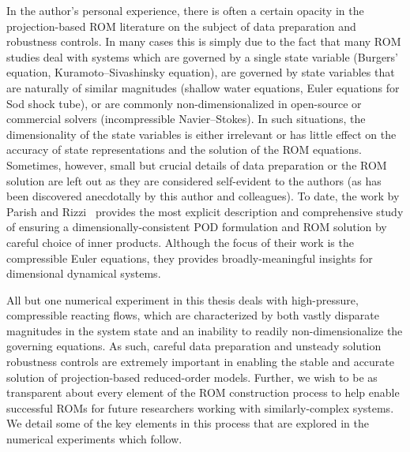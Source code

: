 In the author's personal experience, there is often a certain opacity in the projection-based ROM literature on the subject of data preparation and robustness controls. In many cases this is simply due to the fact that many ROM studies deal with systems which are governed by a single state variable (Burgers' equation, Kuramoto--Sivashinsky equation), are governed by state variables that are naturally of similar magnitudes (shallow water equations, Euler equations for Sod shock tube), or are commonly non-dimensionalized in open-source or commercial solvers (incompressible Navier--Stokes). In such situations, the dimensionality of the state variables is either irrelevant or has little effect on the accuracy of state representations and the solution of the ROM equations. Sometimes, however, small but crucial details of data preparation or the ROM solution are left out as they are considered self-evident to the authors (as has been discovered anecdotally by this author and colleagues). To date, the work by Parish and Rizzi~\cite{Parish2022} provides the most explicit description and comprehensive study of ensuring a dimensionally-consistent POD formulation and ROM solution by careful choice of inner products. Although the focus of their work is the compressible Euler equations, they provides broadly-meaningful insights for dimensional dynamical systems.

All but one numerical experiment in this thesis deals with high-pressure, compressible reacting flows, which are characterized by both vastly disparate magnitudes in the system state and an inability to readily non-dimensionalize the governing equations. As such, careful data preparation and unsteady solution robustness controls are extremely important in enabling the stable and accurate solution of projection-based reduced-order models. Further, we wish to be as transparent about every element of the ROM construction process to help enable successful ROMs for future researchers working with similarly-complex systems. We detail some of the key elements in this process that are explored in the numerical experiments which follow.